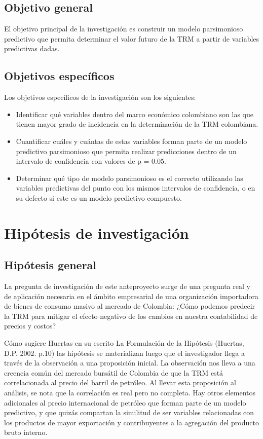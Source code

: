 \subsection{Objetivo general}
El objetivo principal de la investigación es construir un modelo parsimonioso predictivo que permita determinar el valor futuro de la TRM a partir de variables predictivas dadas.

\subsection{Objetivos específicos}
Los objetivos específicos de la investigación son los siguientes:
\begin{itemize}
    \item   Identificar qué variables dentro del marco económico colombiano son las que tienen mayor grado de incidencia en la determinación de la TRM colombiana.
    \item Cuantificar cuáles y cuántas de estas variables forman parte de un modelo predictivo parsimonioso que permita realizar predicciones dentro de un intervalo de confidencia con valores de p = 0.05.
    \item Determinar qué tipo de modelo parsimonioso es el correcto utilizando las variables predictivas del punto con los mismos intervalos de confidencia, o en su defecto si este es un modelo predictivo compuesto. 
\end{itemize}

\section{Hipótesis de investigación}
\subsection{Hipótesis general}
La pregunta de investigación de este anteproyecto surge de una pregunta real y de aplicación necesaria en el ámbito empresarial de una organización importadora de bienes de consumo masivo al mercado de Colombia: ¿Cómo podemos predecir la TRM para mitigar el efecto negativo de los cambios en nuestra contabilidad de precios y costos?

Cómo sugiere Huertas en su escrito La Formulación de la Hipótesis (Huertas, D.P. 2002. p.10) las hipótesis se materializan luego que el investigador llega a través de la observación a una proposición inicial. La observación nos lleva a una creencia común del mercado bursátil de Colombia de que la TRM está correlacionada al precio del barril de petróleo. Al llevar esta proposición al análisis, se nota que la correlación es real pero no completa. Hay otros elementos adicionales al precio internacional de petróleo que forman parte de un modelo predictivo, y que quizás compartan la similitud de ser variables relacionadas con los productos de mayor exportación y contribuyentes a la agregación del producto bruto interno. 

